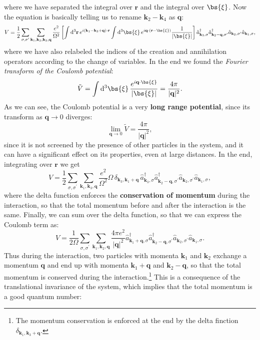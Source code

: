 where we have separated the integral over \(\mathbf{r}\) and the integral over \(\bs{\xi}\). Now the equation is basically telling us to rename \(\mathbf{k}_2 - \mathbf{k}_4\) as \(\mathbf{q}\):
\[
    V = \frac{1}{2} \sum_{\sigma,\sigma^{\prime}} \sum_{\mathbf{k}_1, \mathbf{k}_2, \mathbf{k}_3, \mathbf{q}} \frac{e^2}{\Omega^2} \left[ \int \mathrm{d}^3 \mathbf{r} \, e^{i (\mathbf{k}_1 - \mathbf{k}_3 + \mathbf{q}) \cdot \mathbf{r}} \int \mathrm{d}^3 \bs{\xi} \, e^{i \mathbf{q} \cdot (\mathbf{r} - \bs{\xi})} \frac{1}{\vert \bs{\xi} \vert} \right] \hat{a}_{\mathbf{k}_3, \sigma}^\dagger \hat{a}_{\mathbf{k}_2 - \mathbf{q}, \sigma^{\prime}}^\dagger \hat{a}_{\mathbf{k}_2, \sigma^{\prime}} \hat{a}_{\mathbf{k}_1, \sigma},
\]
where we have also relabeled the indices of the creation and annihilation operators according to the change of variables. In the end we found the \textit{Fourier transform of the Coulomb potential}:
\[
    \tilde{V} = \int \mathrm{d}^3 \bs{\xi} \, \frac{e^{i \mathbf{q} \cdot \bs{\xi}}}{\vert \bs{\xi} \vert} = \frac{4\pi}{\vert \mathbf{q} \vert^2}.
\]
As we can see, the Coulomb potential is a very \textbf{long range potential}, since its transform as \(\mathbf{q} \to 0\) diverges:
\[
    \lim_{\mathbf{q} \to 0} \tilde{V} = \frac{4 \pi}{\vert \mathbf{q} \vert^2},
\]
since it is not screened by the presence of other particles in the system, and it can have a significant effect on its properties, even at large distances. In the end, integrating over \(\mathbf{r}\) we get
\[
    V = \frac{1}{2} \sum_{\sigma,\sigma^{\prime}} \sum_{\mathbf{k}_1, \mathbf{k}_3, \mathbf{q}} \frac{e^2}{\Omega^2} \Omega \, \delta_{\mathbf{k}_3, \mathbf{k}_1 + \mathbf{q}} \, \hat{a}_{\mathbf{k}_3, \sigma}^\dagger \hat{a}_{\mathbf{k}_2 - \mathbf{q}, \sigma^{\prime}}^\dagger \hat{a}_{\mathbf{k}_2, \sigma^{\prime}} \hat{a}_{\mathbf{k}_1, \sigma},
\]
where the delta function enforces the \textbf{conservation of momentum} during the interaction, so that the total momentum before and after the interaction is the same. Finally, we can sum over the delta function, so that we can express the Coulomb term as:
\[
    V = \frac{1}{2 \Omega} \sum_{\sigma,\sigma^{\prime}} \sum_{\mathbf{k}_1, \mathbf{k}_2, \mathbf{q}} \frac{4 \pi e^2}{\vert \mathbf{q} \vert^2} \hat{a}_{\mathbf{k}_1 + \mathbf{q}, \sigma}^\dagger \hat{a}_{\mathbf{k}_2 - \mathbf{q}, \sigma^{\prime}}^\dagger \hat{a}_{\mathbf{k}_2, \sigma^{\prime}} \hat{a}_{\mathbf{k}_1, \sigma}.
\]
Thus during the interaction, two particles with momenta \(\mathbf{k}_1\) and \(\mathbf{k}_2\) exchange a momentum \(\mathbf{q}\) and end up with momenta \(\mathbf{k}_1 + \mathbf{q}\) and \(\mathbf{k}_2 - \mathbf{q}\), so that the total momentum is conserved during the interaction.\footnote{The momentum conservation is enforced at the end by the delta finction \(\delta_{\mathbf{k}_1, \mathbf{k}_3 + \mathbf{q}}\).} This is a consequence of the translational invariance of the system, which implies that the total momentum is a good quantum number:
